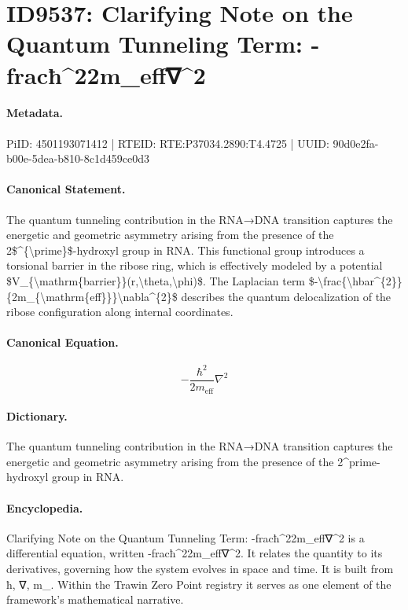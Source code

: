 \section*{ID9537: Clarifying Note on the Quantum Tunneling Term: -fracħ\textasciicircum{}22m\_eff∇\textasciicircum{}2}
\paragraph{Metadata.}
PiID: 4501193071412 | RTEID: RTE:P37034.2890:T4.4725 | UUID: 90d0e2fa-b00e-5dea-b810-8c1d459ce0d3

\paragraph{Canonical Statement.}
The quantum tunneling contribution in the RNA→DNA transition captures the energetic and geometric asymmetry arising from the presence of the 2\$\textasciicircum{}\{\textbackslash{}prime\}\$-hydroxyl group in RNA. This functional group introduces a torsional barrier in the ribose ring, which is effectively modeled by a potential \$V\_\{\textbackslash{}mathrm\{barrier\}\}(r,\textbackslash{}theta,\textbackslash{}phi)\$. The Laplacian term \$-\textbackslash{}frac\{\textbackslash{}hbar\textasciicircum{}\{2\}\}\{2m\_\{\textbackslash{}mathrm\{eff\}\}\}\textbackslash{}nabla\textasciicircum{}\{2\}\$ describes the quantum delocalization of the ribose configuration along internal coordinates.

\paragraph{Canonical Equation.}
\[
-\frac{\hbar^{2}}{2m_{\mathrm{eff}}}\nabla^{2}
\]

\paragraph{Dictionary.}
The quantum tunneling contribution in the RNA→DNA transition captures the energetic and geometric asymmetry arising from the presence of the 2\textasciicircum{}prime-hydroxyl group in RNA.

\paragraph{Encyclopedia.}
Clarifying Note on the Quantum Tunneling Term: -fracħ\textasciicircum{}22m\_eff∇\textasciicircum{}2 is a differential equation, written -fracħ\textasciicircum{}22m\_eff∇\textasciicircum{}2. It relates the quantity to its derivatives, governing how the system evolves in space and time. It is built from ħ, ∇, m\_. Within the Trawin Zero Point registry it serves as one element of the framework's mathematical narrative.
